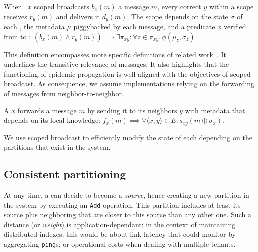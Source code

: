 \begin{definition}
  When \Process~$x$ scoped \underline{b}roadcasts $b_x(m)$ a
  \underline{m}essage $m$, every correct \process $y$ within a scope
  \underline{r}eceives $r_y(m)$ and \underline{d}elivers it
  $d_y(m)$. The scope depends on the \underline{s}tate $\sigma$ of
  each \process, the \underline{m}etadata $\mu$ piggybacked by each
  message, and a \underline{p}redicate $\phi$ verified from \process
  to \process:
  $(b_x(m) \wedge r_y(m)) \implies \exists \pi_{xy}: \forall z \in
  \pi_{xy}, \phi(\mu_z, \sigma_z)$.
\end{definition}

This definition encompasses more specific definitions of related
work~\cite{hsiao2005scoped, lue2006scoped, wang2015prodiluvian}. It
underlines the transitive relevance of messages. It also highlights
that the functioning of epidemic propagation is well-aligned with the
objectives of scoped broadcast. As consequence, we assume
implementations relying on the forwarding of messages from
neighbor-to-neighbor.

\begin{definition}
  A \process $x$ \underline{f}orwards a message $m$ by
  \underline{s}ending it to its neighbors $y$ with metadata that
  depends on its local knowledge: $f_x(m) \implies \forall \langle x,
  y\rangle \in E: s_{xy}(m \oplus \sigma_x)$.
\end{definition}

We use scoped broadcast to efficiently modify the state of each
\process depending on the partitions that exist in the system.



\subsection{Consistent partitioning}
\label{subsec:consistent}

At any time, a \process can decide to become a \emph{source}, hence
creating a new partition in the system by executing an \texttt{Add}
operation. This partition includes at least its source plus
neighboring \processes that are closer to this source than any other
one. Such a distance (or \emph{weight}) is application-dependant: in
the context of maintaining distributed indexes, this would be about
link latency that \nodes could monitor by aggregating \texttt{ping}s;
or operational costs when dealing with multiple tenants.

